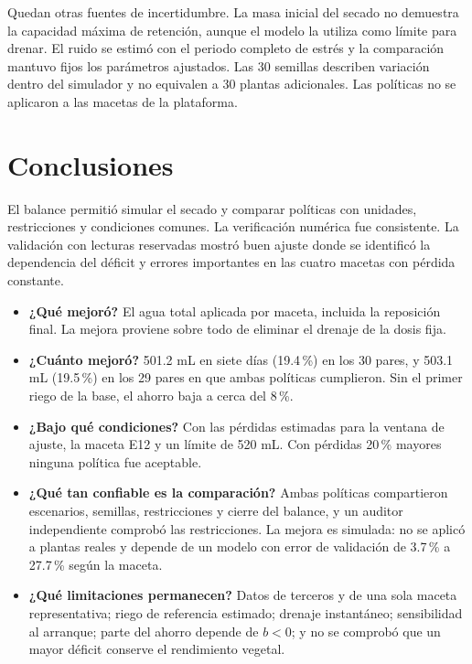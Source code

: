 \documentclass[12pt]{article}
\begin{document}
Quedan otras fuentes de incertidumbre. La masa inicial del secado no demuestra la capacidad máxima de retención, aunque el modelo la utiliza como límite para drenar. El ruido se estimó con el periodo completo de estrés y la comparación mantuvo fijos los parámetros ajustados. Las 30 semillas describen variación dentro del simulador y no equivalen a 30 plantas adicionales. Las políticas no se aplicaron a las macetas de la plataforma.

\section{Conclusiones}

El balance permitió simular el secado y comparar políticas con unidades, restricciones y condiciones comunes. La verificación numérica fue consistente. La validación con lecturas reservadas mostró buen ajuste donde se identificó la dependencia del déficit y errores importantes en las cuatro macetas con pérdida constante.

\begin{itemize}
\item \textbf{¿Qué mejoró?} El agua total aplicada por maceta, incluida la reposición final. La mejora proviene sobre todo de eliminar el drenaje de la dosis fija.
\item \textbf{¿Cuánto mejoró?} 501.2 mL en siete días (19.4\,\%) en los 30 pares, y 503.1 mL (19.5\,\%) en los 29 pares en que ambas políticas cumplieron. Sin el primer riego de la base, el ahorro baja a cerca del 8\,\%.
\item \textbf{¿Bajo qué condiciones?} Con las pérdidas estimadas para la ventana de ajuste, la maceta E12 y un límite de 520 mL. Con pérdidas 20\,\% mayores ninguna política fue aceptable.
\item \textbf{¿Qué tan confiable es la comparación?} Ambas políticas compartieron escenarios, semillas, restricciones y cierre del balance, y un auditor independiente comprobó las restricciones. La mejora es simulada: no se aplicó a plantas reales y depende de un modelo con error de validación de 3.7\,\% a 27.7\,\% según la maceta.
\item \textbf{¿Qué limitaciones permanecen?} Datos de terceros y de una sola maceta representativa; riego de referencia estimado; drenaje instantáneo; sensibilidad al arranque; parte del ahorro depende de $b<0$; y no se comprobó que un mayor déficit conserve el rendimiento vegetal.
\end{itemize}
\end{document}
